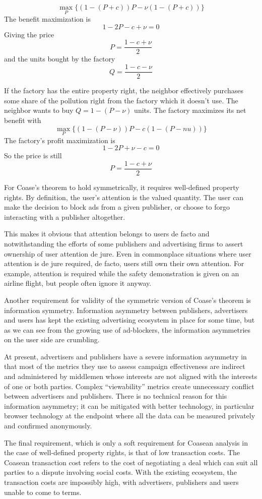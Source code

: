 \documentclass[11pt]{article}
\begin{document}
\[ \max_{P} \{ (1-(P+c))P - \nu(1-(P+c)) \} \]
The benefit maximization is \[1-2P -c + \nu = 0\]
Giving the price \[P =\frac{1-c+\nu}{2} \] and the units bought by the factory 
\[Q=\frac{1-c-\nu}{2} \]

   If the factory has the entire property right, the neighbor effectively purchases some share of the pollution right from the factory which it doesn't use. The neighbor wants to buy $Q=1-(P-\nu)$ units. The factory maximizes its net benefit with
   \[ \max_{P} \{ (1-(P-\nu))P - c(1-(P -nu)) \}  \]
   The factory's profit maximization is
   \[ 1-2P + \nu -c = 0\]
   So the price is still \[P=\frac{1-c+\nu}{2} \]

For Coase's theorem to hold symmetrically, it requires well-defined
property rights. By definition, the user's attention is the valued
quantity. The user can make the decision to block ads from a given
publisher, or choose to forgo interacting with a publisher altogether.

This makes it obvious that attention belongs to users de facto and
notwithstanding the efforts of some publishers and advertising firms
to assert ownership of user attention de jure. Even in commonplace
situations where user attention is de jure required, de facto, users
still own their own attention. For example, attention is required
while the safety demonstration is given on an airline flight, but
people often ignore it anyway.

Another requirement for validity of the symmetric version of Coase's
theorem is information symmetry. Information asymmetry between
publishers, advertisers and users has kept the existing advertising
ecosystem in place for some time, but as we can see from the growing
use of ad-blockers, the information asymmetries on the user side are
crumbling. 

At present, advertisers and publishers have a severe information
asymmetry in that most of the metrics they use to assess campaign
effectiveness are indirect and administered by middlemen whose
interests are not aligned with the interests of one or both
parties. Complex ``viewability'' metrics create unnecessary conflict
between advertisers and publishers. There is no technical reason for
this information asymmetry; it can be mitigated with better
technology, in particular browser technology at the endpoint where all
the data can be measured privately and confirmed anonymously.

The final requirement, which is only a soft requirement for Coasean
analysis in the case of well-defined property rights, is that of low
transaction costs. The Coasean transaction cost refers to the cost of
negotiating a deal which can suit all parties to a dispute involving
social costs. With the existing ecosystem, the transaction costs are
impossibly high, with advertisers, publishers and users unable to come
to terms. 
\end{document}
